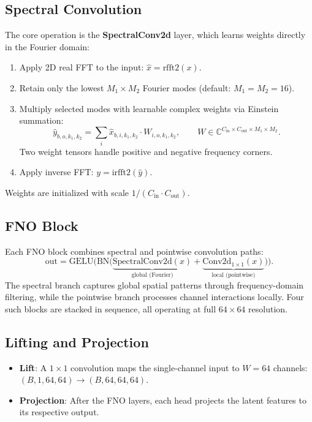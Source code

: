 \documentclass[11pt,a4paper]{article}
\begin{document}
\subsection{Spectral Convolution}

The core operation is the \textbf{SpectralConv2d} layer, which learns weights
directly in the Fourier domain:

\begin{enumerate}[leftmargin=2em]
    \item Apply 2D real FFT to the input: $\hat{x} = \text{rfft2}(x)$.
    \item Retain only the lowest $M_1 \times M_2$ Fourier modes (default:
          $M_1 = M_2 = 16$).
    \item Multiply selected modes with learnable complex weights via
          Einstein summation:
          \[
              \hat{y}_{b,o,k_1,k_2} = \sum_{i} \hat{x}_{b,i,k_1,k_2}
              \cdot W_{i,o,k_1,k_2}, \qquad W \in \mathbb{C}^{C_\text{in}
              \times C_\text{out} \times M_1 \times M_2}.
          \]
          Two weight tensors handle positive and negative frequency corners.
    \item Apply inverse FFT: $y = \text{irfft2}(\hat{y})$.
\end{enumerate}

Weights are initialized with scale $1 / (C_\text{in} \cdot C_\text{out})$.

\subsection{FNO Block}

Each FNO block combines spectral and pointwise convolution paths:
\[
    \text{out} = \text{GELU}\!\Big(\text{BN}\big(
        \underbrace{\text{SpectralConv2d}(x)}_{\text{global (Fourier)}}
        + \underbrace{\text{Conv2d}_{1 \times 1}(x)}_{\text{local (pointwise)}}
    \big)\Big).
\]
The spectral branch captures global spatial patterns through frequency-domain
filtering, while the pointwise branch processes channel interactions locally.
Four such blocks are stacked in sequence, all operating at full $64 \times 64$
resolution.

\subsection{Lifting and Projection}

\begin{itemize}[leftmargin=2em]
    \item \textbf{Lift}: A $1 \times 1$ convolution maps the single-channel
          input to $W = 64$ channels: $(B, 1, 64, 64) \to (B, 64, 64, 64)$.
    \item \textbf{Projection}: After the FNO layers, each head projects
          the latent features to its respective output.
\end{itemize}
\end{document}
